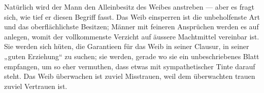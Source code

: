 Natürlich wird der Mann den Alleinbesitz des Weibes anstreben — aber es fragt sich, wie tief er diesen Begriff fasst. Das Weib einsperren ist die unbeholfenste Art und das oberflächlichste Besitzen; Männer mit feineren Ansprüchen werden es auf  anlegen, womit der vollkommenste Verzicht auf äussere Machtmittel vereinbar ist. Sie werden sich hüten, die Garantieen für das Weib in seiner Clausur, in seiner „guten Erziehung“ zu suchen; sie werden, gerade wo sie ein unbeschriebenes Blatt empfangen, um so eher vermuthen, dass etwas mit sympathetischer Tinte darauf steht. Das Weib überwachen ist zuviel Misstrauen, weil dem überwachten trauen zuviel Vertrauen ist.
\par

